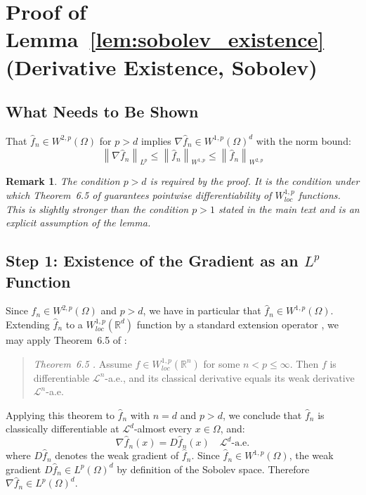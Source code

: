 \documentclass[12pt]{article}
\newtheorem{remark}{Remark}
\newcommand{\norm}[1]{\left\| #1 \right\|}
\newcommand{\R}{\mathbb{R}}
\newcommand{\fn}{\hat{f}_n}
\begin{document}
	\section{Proof of Lemma~\ref{lem:sobolev_existence}
		(Derivative Existence, Sobolev)}
	\label{app:lem_sobolev_existence}
	
	\subsection{What Needs to Be Shown}
	
	That $\fn \in W^{2,p}(\Omega)$ for $p > d$ implies $\nabla \fn \in
	W^{1,p}(\Omega)^d$ with the norm bound:
	\begin{equation}
		\norm{\nabla \fn}_{L^p}
		\leq \norm{\fn}_{W^{1,p}}
		\leq \norm{\fn}_{W^{2,p}}
	\end{equation}
	
	\begin{remark}
		The condition $p > d$ is required by the proof. It is the condition under
		which Theorem~6.5 of \citet{evans2015measure} guarantees pointwise
		differentiability of $W^{1,p}_{loc}$ functions. This is slightly stronger
		than the condition $p > 1$ stated in the main text and is an explicit
		assumption of the lemma.
	\end{remark}
	
	\subsection{Step 1: Existence of the Gradient as an $L^p$ Function}
	
	Since $\fn \in W^{2,p}(\Omega)$ and $p > d$, we have in particular that
	$\fn \in W^{1,p}(\Omega)$. Extending $\fn$ to a $W^{1,p}_{loc}(\R^d)$
	function by a standard extension operator \citep[Section~4.4]{evans2015measure},
	we may apply Theorem~6.5 of \citet{evans2015measure}:
	
	\begin{quote}
		\textit{Theorem~6.5 \citep{evans2015measure}.}
		Assume $f \in W^{1,p}_{loc}(\R^n)$ for some $n < p \leq \infty$. Then $f$
		is differentiable $\mathcal{L}^n$-a.e., and its classical derivative equals
		its weak derivative $\mathcal{L}^n$-a.e.
	\end{quote}
	
	Applying this theorem to $\fn$ with $n = d$ and $p > d$, we conclude that
	$\fn$ is classically differentiable at $\mathcal{L}^d$-almost every $x \in
	\Omega$, and:
	\begin{equation}
		\nabla \fn(x) = D\fn(x) \quad \mathcal{L}^d\text{-a.e.}
	\end{equation}
	where $D\fn$ denotes the weak gradient of $\fn$. Since $\fn \in W^{1,p}(\Omega)$,
	the weak gradient $D\fn \in L^p(\Omega)^d$ by definition of the Sobolev space.
	Therefore $\nabla \fn \in L^p(\Omega)^d$.
	
\end{document}

